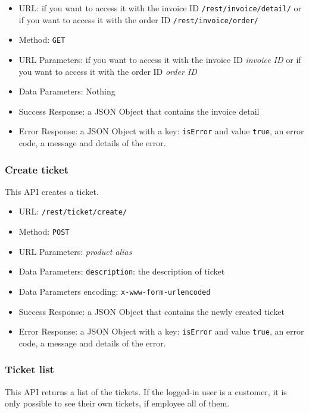 \begin{itemize}
    \item URL: if you want to access it with the invoice ID \texttt{/rest/invoice/detail/} or if you want to access it with the order ID \texttt{/rest/invoice/order/}
    \item Method: \texttt{GET}
    \item URL Parameters: if you want to access it with the invoice ID \textit{invoice ID} or if you want to access it with the order ID \textit{order ID}
    \item Data Parameters: Nothing
    \item Success Response: a JSON Object that contains the invoice detail
    \item Error Response: a JSON Object with a key: \texttt{isError}  and value \texttt{true}, an error code, a message and details of the error.
\end{itemize}

\subsubsection*{Create ticket}

This API creates a ticket.

\begin{itemize}
    \item URL: \texttt{/rest/ticket/create/}
    \item Method: \texttt{POST}
    \item URL Parameters: \textit{product alias}
    \item Data Parameters: \texttt{description}: the description of ticket
    \item Data Parameters encoding: \texttt{x-www-form-urlencoded}
    \item Success Response: a JSON Object that contains the newly created ticket
    \item Error Response: a JSON Object with a key: \texttt{isError}  and value \texttt{true}, an error code, a message and details of the error.
\end{itemize}

\subsubsection*{Ticket list}

This API returns a list of the tickets.
If the logged-in user is a customer, it is only possible to see their own tickets, if employee all of them.

